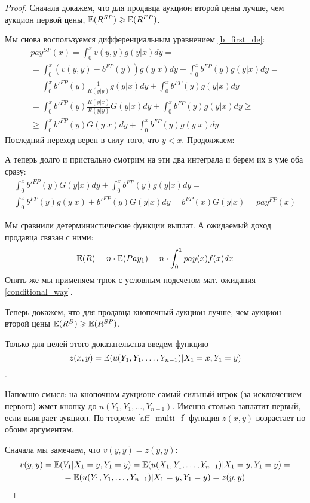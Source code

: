\begin{proof}
Сначала докажем, что для продавца аукцион второй цены лучше, чем аукцион первой цены, $ \mathbb{E}(R^{SP})\geqslant \mathbb{E}(R^{FP}) $.


Мы снова воспользуемся дифференциальным уравнением \ref{b_first_de}:
\begin{multline}
pay^{SP}(x)=\int_{0}^{x}v(y,y)g(y|x)dy=\\
=\int_{0}^{x}(v(y,y)-b^{FP}(y))g(y|x)dy+\int_{0}^{x}b^{FP}(y)g(y|x)dy=\\
=\int_{0}^{x}b'^{FP}(y)\frac{1}{R(y|y)}g(y|x)dy+\int_{0}^{x}b^{FP}(y)g(y|x)dy=\\
=\int_{0}^{x}b'^{FP}(y)\frac{R(y|x)}{R(y|y)}G(y|x)dy+\int_{0}^{x}b^{FP}(y)g(y|x)dy\geq\\
\geq \int_{0}^{x}b'^{FP}(y)G(y|x)dy+\int_{0}^{x}b^{FP}(y)g(y|x)dy
\end{multline}
Последний переход верен в силу того, что $ y<x $. Продолжаем:

А теперь долго и пристально смотрим на эти два интеграла и берем их в уме оба сразу:
\begin{multline}
\int_{0}^{x}b'^{FP}(y)G(y|x)dy+\int_{0}^{x}b^{FP}(y)g(y|x)dy=\\
\int_{0}^{x}b^{FP}(y)g(y|x)+b'^{FP}(y)G(y|x) dy=b^{FP}(x)G(y|x)=pay^{FP}(x)
\end{multline}

Мы сравнили детерминистические функции выплат. А ожидаемый доход продавца связан с ними:
\begin{equation}
\mathbb{E}(R)=n\cdot \mathbb{E}(Pay_{1})=n\cdot \int_{0}^{1}pay(x)f(x)dx
\end{equation}
Опять же мы применяем трюк с условным подсчетом мат. ожидания \ref{conditional_way}.

Теперь докажем, что для продавца кнопочный аукцион лучше, чем аукцион второй цены $ \mathbb{E}(R^{B})\geqslant \mathbb{E}(R^{SP}) $.

Только для целей этого доказательства введем функцию $$z(x,y)=\mathbb{E}(u(Y_{1},Y_{1},\ldots,Y_{n-1})|X_{1}=x,Y_{1}=y) $$. 

Напомню смысл: на кнопочном аукционе самый сильный игрок (за исключением первого) жмет кнопку до $ u(Y_{1},Y_{1},\ldots,Y_{n-1}) $. Именно столько заплатит первый, если выиграет аукцион. По теореме \ref{aff_multi_f} функция $ z(x,y) $ возрастает по обоим аргументам.

Сначала мы замечаем, что $ v(y,y)=z(y,y) $:
\begin{multline}
v(y,y)=\mathbb{E}(V_{1}|X_{1}=y, Y_{1}=y)=\mathbb{E}(u(X_{1},Y_{1},\ldots,Y_{n-1})|X_{1}=y, Y_{1}=y)=\\
=\mathbb{E}(u(Y_{1},Y_{1},\ldots,Y_{n-1})|X_{1}=y, Y_{1}=y)=z(y,y)
\end{multline}


\end{proof}
